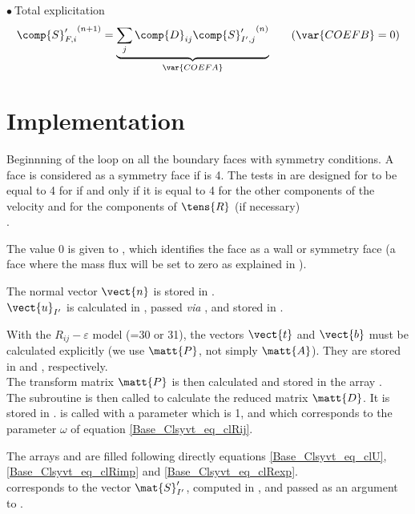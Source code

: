 $\bullet\ ${\sc Total explicitation}\\
\begin{equation}
\label{Base_Clsyvt_eq_clRexp}
{\comp{S}_{F,i}^\prime}^{(n+1)} =
\underbrace{\sum_j\comp{D}_{ij}{\comp{S}_{I',j}^\prime}^{(n)}}_{\var{COEFA}}
\qquad(\var{COEFB}=0)
\end{equation}

\section*{Implementation}
\label{Base_Clsyvt_prg_meo}%

Beginnning of the loop on all the boundary faces   with
symmetry conditions.
A face is considered as a symmetry face if
 is 4. The tests in  are designed
 for   to be equal to 4 for  if and only if it is equal
to 4 for the other components of the velocity and for the components of $\tens{R}$
(if necessary)\\.

The value 0 is given to  , which identifies the face as a
wall or symmetry face (a face where the mass flux will be set to zero as
explained in ).

The normal vector $\vect{n}$ is stored in .\\
$\vect{u}_{I'}$ is calculated in , passed {\em via} ,
and stored in .

With the $R_{ij}-\varepsilon$ model (=30 or 31), the vectors
 $\vect{t}$ and $\vect{b}$ must be calculated explicitly
(we use $\matt{P}$, not simply $\matt{A}$).
They are stored in  and
, respectively.\\
The transform matrix $\matt{P}$ is then calculated and stored in the array .\\
The subroutine  is then called to calculate the reduced
matrix $\matt{D}$. It is stored in .  is called
with a parameter  which is 1, and which corresponds to the parameter
$\omega$ of equation \ref{Base_Clsyvt_eq_clRij}.


The arrays  and  are filled following directly
equations \ref{Base_Clsyvt_eq_clU}, \ref{Base_Clsyvt_eq_clRimp} and \ref{Base_Clsyvt_eq_clRexp}.\\
 corresponds to the vector $\mat{S}_{I'}^\prime$, computed in
, and passed as an argument to .


